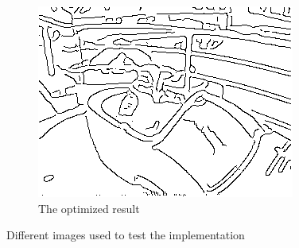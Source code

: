 \documentclass[10pt,final,journal]{IEEEtran}
\begin{document}
\begin{figure}[h!]
\begin{subfigure}[b]{0.3\textwidth}
            \includegraphics[width=\textwidth]{klomp_out}
            \caption{The optimized result}
            \label{fig:app_klomp_out}
    \end{subfigure}
    
    \caption{Different images used to test the implementation}
    \label{fig:imgdiff}
\end{figure}
\end{document}
